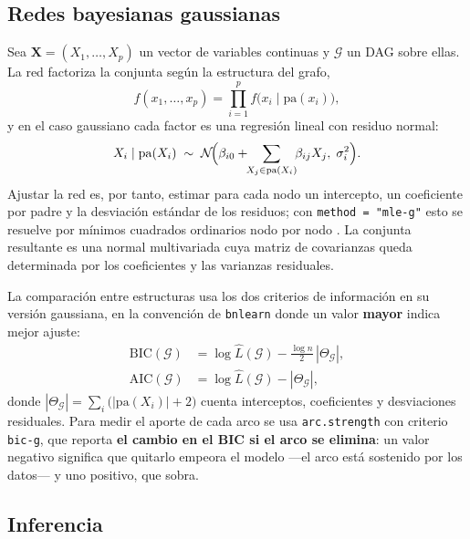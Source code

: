 \documentclass[11pt, a4paper]{article}
\begin{document}
\subsection{Redes bayesianas gaussianas}

Sea $\mathbf{X}=(X_1,\ldots,X_p)$ un vector de variables continuas y $\mathcal{G}$ un DAG sobre
ellas. La red factoriza la conjunta según la estructura del grafo,
\begin{equation}
    f(x_1,\ldots,x_p) = \prod_{i=1}^{p} f\bigl(x_i \mid \mathrm{pa}(x_i)\bigr),
    \label{eq:factorizacion}
\end{equation}
y en el caso gaussiano cada factor es una regresión lineal con residuo normal:
\begin{equation}
    X_i \mid \mathrm{pa}(X_i) \;\sim\; \mathcal{N}\!\Bigl(\beta_{i0} +
    \!\!\sum_{X_j \in \mathrm{pa}(X_i)}\!\! \beta_{ij} X_j,\; \sigma_i^2\Bigr).
    \label{eq:gbn}
\end{equation}
Ajustar la red es, por tanto, estimar para cada nodo un intercepto, un coeficiente por padre y la
desviación estándar de los residuos; con \texttt{method = "mle-g"} esto se resuelve por mínimos
cuadrados ordinarios nodo por nodo \cite{shachter1989,geiger1994}. La conjunta resultante es una
normal multivariada cuya matriz de covarianzas queda determinada por los coeficientes y las
varianzas residuales.

La comparación entre estructuras usa los dos criterios de información en su versión gaussiana, en
la convención de \texttt{bnlearn} donde un valor \textbf{mayor} indica mejor ajuste:
\begin{align}
    \mathrm{BIC}(\mathcal{G}) &= \log \hat{L}(\mathcal{G}) - \frac{\log n}{2}\,|\Theta_{\mathcal{G}}|,
    \label{eq:bic}\\
    \mathrm{AIC}(\mathcal{G}) &= \log \hat{L}(\mathcal{G}) - |\Theta_{\mathcal{G}}|,
    \label{eq:aic}
\end{align}
donde $|\Theta_{\mathcal{G}}| = \sum_i \bigl(|\mathrm{pa}(X_i)| + 2\bigr)$ cuenta interceptos,
coeficientes y desviaciones residuales. Para medir el aporte de cada arco se usa
\texttt{arc.strength} con criterio \texttt{bic-g}, que reporta \textbf{el cambio en el BIC si el
arco se elimina}: un valor negativo significa que quitarlo empeora el modelo —el arco está
sostenido por los datos— y uno positivo, que sobra.

\subsection{Inferencia}
\end{document}

